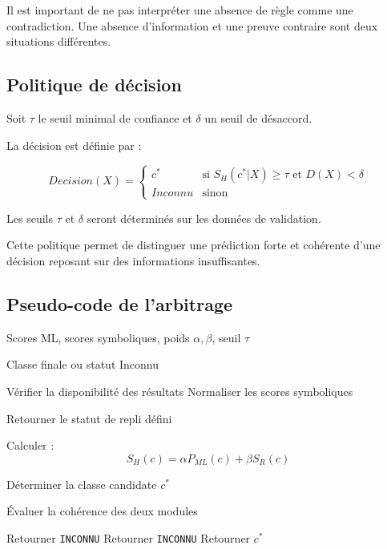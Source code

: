 Il est important de ne pas interpréter une absence
de règle comme une contradiction. Une absence
d'information et une preuve contraire sont deux
situations différentes.

\subsection{Politique de décision}

Soit $\tau$ le seuil minimal de confiance et
$\delta$ un seuil de désaccord.

La décision est définie par :

\[
Decision(X)=
\begin{cases}
c^* & \text{si } S_H(c^*|X)\geq\tau
\text{ et } D(X)<\delta\\
Inconnu & \text{sinon}
\end{cases}
\]

Les seuils $\tau$ et $\delta$ seront déterminés
sur les données de validation.

Cette politique permet de distinguer une prédiction
forte et cohérente d'une décision reposant sur
des informations insuffisantes.

\subsection{Pseudo-code de l'arbitrage}

\begin{algorithm}[H]
\caption{Arbitrage hybride et décision de rejet}
\label{alg:arbitrage}
\begin{algorithmic}[1]

\Require Scores ML, scores symboliques,
poids $\alpha,\beta$, seuil $\tau$

\Ensure Classe finale ou statut Inconnu

\State Vérifier la disponibilité des résultats
\State Normaliser les scores symboliques

    \State Retourner le statut de repli défini
\EndIf

    \State Calculer :
    \[
    S_H(c)=\alpha P_{ML}(c)+\beta S_R(c)
    \]
\EndFor

\State Déterminer la classe candidate $c^*$

\State Évaluer la cohérence des deux modules

    \State Retourner \texttt{INCONNU}
    \State Retourner \texttt{INCONNU}
\Else
    \State Retourner $c^*$
\EndIf

\end{algorithmic}
\end{algorithm}

